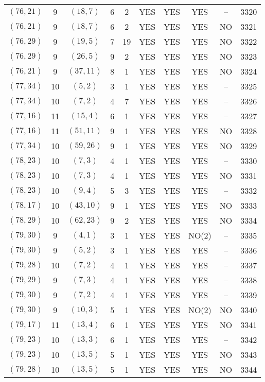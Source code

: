 \begin{longtable}{|c|c|c|c|c|c|c|c|c|c|}
$(76, 21)$ & 9 & $(18, 7)$ & 6 & 2 & YES & YES & YES & -- & 3320\\
$(76, 21)$ & 9 & $(18, 7)$ & 6 & 2 & YES & YES & YES & NO & 3321\\
$(76, 29)$ & 9 & $(19, 5)$ & 7 & 19 & YES & YES & YES & NO & 3322\\
$(76, 29)$ & 9 & $(26, 5)$ & 9 & 2 & YES & YES & YES & NO & 3323\\
$(76, 21)$ & 9 & $(37, 11)$ & 8 & 1 & YES & YES & YES & NO & 3324\\
$(77, 34)$ & 10 & $(5, 2)$ & 3 & 1 & YES & YES & YES & -- & 3325\\
$(77, 34)$ & 10 & $(7, 2)$ & 4 & 7 & YES & YES & YES & -- & 3326\\
$(77, 16)$ & 11 & $(15, 4)$ & 6 & 1 & YES & YES & YES & -- & 3327\\
$(77, 16)$ & 11 & $(51, 11)$ & 9 & 1 & YES & YES & YES & NO & 3328\\
$(77, 34)$ & 10 & $(59, 26)$ & 9 & 1 & YES & YES & YES & NO & 3329\\
$(78, 23)$ & 10 & $(7, 3)$ & 4 & 1 & YES & YES & YES & -- & 3330\\
$(78, 23)$ & 10 & $(7, 3)$ & 4 & 1 & YES & YES & YES & NO & 3331\\
$(78, 23)$ & 10 & $(9, 4)$ & 5 & 3 & YES & YES & YES & -- & 3332\\
$(78, 17)$ & 10 & $(43, 10)$ & 9 & 1 & YES & YES & YES & NO & 3333\\
$(78, 29)$ & 10 & $(62, 23)$ & 9 & 2 & YES & YES & YES & NO & 3334\\
$(79, 30)$ & 9 & $(4, 1)$ & 3 & 1 & YES & YES & NO(2) & -- & 3335\\
$(79, 30)$ & 9 & $(5, 2)$ & 3 & 1 & YES & YES & YES & -- & 3336\\
$(79, 28)$ & 10 & $(7, 2)$ & 4 & 1 & YES & YES & YES & -- & 3337\\
$(79, 29)$ & 9 & $(7, 3)$ & 4 & 1 & YES & YES & YES & -- & 3338\\
$(79, 30)$ & 9 & $(7, 2)$ & 4 & 1 & YES & YES & YES & -- & 3339\\
$(79, 30)$ & 9 & $(10, 3)$ & 5 & 1 & YES & YES & NO(2) & NO & 3340\\
$(79, 17)$ & 11 & $(13, 4)$ & 6 & 1 & YES & YES & YES & NO & 3341\\
$(79, 23)$ & 10 & $(13, 3)$ & 6 & 1 & YES & YES & YES & -- & 3342\\
$(79, 23)$ & 10 & $(13, 5)$ & 5 & 1 & YES & YES & YES & NO & 3343\\
$(79, 28)$ & 10 & $(13, 5)$ & 5 & 1 & YES & YES & YES & NO & 3344\\

\end{longtable}
